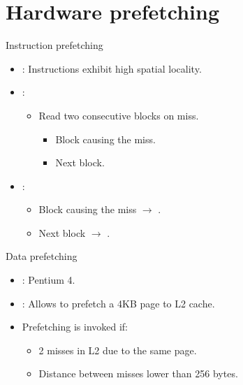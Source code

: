 \section{Hardware prefetching}

\begin{frame}[t]{Instruction prefetching}
\begin{itemize}
  \item {}: 
        Instructions exhibit high spatial locality.

  \item {}: 
    \begin{itemize}
      \item Read two consecutive blocks on miss.
        \begin{itemize}
          \item Block causing the miss.
          \item Next block.
        \end{itemize}
    \end{itemize}

  \item {}:
    \begin{itemize}
      \item Block causing the miss $\rightarrow$ .
      \item Next block $\rightarrow$ .
    \end{itemize}
\end{itemize}
\end{frame}

\begin{frame}[t]{Data prefetching}
\begin{itemize}
  \item {}: Pentium 4.

  \item {}: 
        Allows to prefetch a 4KB page to L2 cache.

  \item Prefetching is invoked if:
    \begin{itemize}
      \item 2 misses in L2 due to the same page.
      \item Distance between misses lower than 256 bytes.
    \end{itemize}

\end{itemize}
\end{frame}

